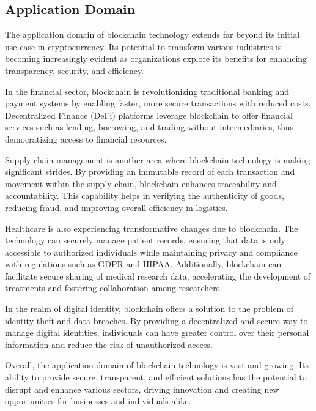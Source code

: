 \documentclass[main.tex]{subfiles}
\begin{document}
\subsection{Application Domain}

The application domain of blockchain technology extends far beyond its initial use case in cryptocurrency. Its potential to transform various industries is becoming increasingly evident as organizations explore its benefits for enhancing transparency, security, and efficiency.

In the financial sector, blockchain is revolutionizing traditional banking and payment systems by enabling faster, more secure transactions with reduced costs. Decentralized Finance (DeFi) platforms leverage blockchain to offer financial services such as lending, borrowing, and trading without intermediaries, thus democratizing access to financial resources.

Supply chain management is another area where blockchain technology is making significant strides. By providing an immutable record of each transaction and movement within the supply chain, blockchain enhances traceability and accountability. This capability helps in verifying the authenticity of goods, reducing fraud, and improving overall efficiency in logistics.

Healthcare is also experiencing transformative changes due to blockchain. The technology can securely manage patient records, ensuring that data is only accessible to authorized individuals while maintaining privacy and compliance with regulations such as GDPR and HIPAA. Additionally, blockchain can facilitate secure sharing of medical research data, accelerating the development of treatments and fostering collaboration among researchers.

In the realm of digital identity, blockchain offers a solution to the problem of identity theft and data breaches. By providing a decentralized and secure way to manage digital identities, individuals can have greater control over their personal information and reduce the risk of unauthorized access.

Overall, the application domain of blockchain technology is vast and growing. Its ability to provide secure, transparent, and efficient solutions has the potential to disrupt and enhance various sectors, driving innovation and creating new opportunities for businesses and individuals alike.
\end{document}
